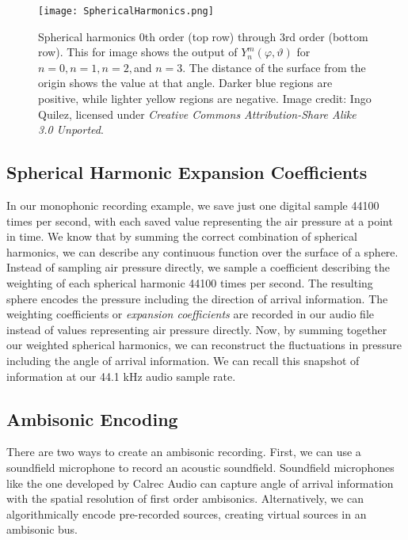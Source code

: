 \begin{figure}[h]
  \texttt{[image: SphericalHarmonics.png]}
  \caption{Spherical harmonics $0$th order (top row) through $3$rd
    order (bottom row). This for image shows the output of
    $Y_{n}^{m}(\varphi,\vartheta)$ for $n=0,n=1,n=2,$and $n=3$. The
    distance of the surface from the origin shows the value at that
    angle. Darker blue regions are positive, while lighter yellow
    regions are negative. Image credit: Ingo Quilez, licensed under
    \textit{Creative Commons Attribution-Share Alike 3.0 Unported}.}
  \label{fig:spherical-harmonics}
\end{figure}

\subsection{Spherical Harmonic Expansion Coefficients}
\label{sec:spher-harm-expans}
In our monophonic recording example, we save just one digital sample
44100 times per second, with each saved value representing the air
pressure at a point in time. We know that by summing the correct
combination of spherical harmonics, we can describe any continuous
function over the surface of a sphere. Instead of sampling air
pressure directly, we sample a coefficient describing the weighting of
each spherical harmonic 44100 times per second. The resulting sphere
encodes the pressure including the direction of arrival
information. The weighting coefficients or \textit{expansion
  coefficients} are recorded in our audio file instead of values
representing air pressure directly. Now, by summing together our
weighted spherical harmonics, we can reconstruct the fluctuations in
pressure including the angle of arrival information. We can recall
this snapshot of information at our 44.1 kHz audio sample rate.

\subsection{Ambisonic Encoding}
\label{sec:usage}
There are two ways to create an ambisonic recording. First, we can use
a soundfield microphone to record an acoustic soundfield. Soundfield
microphones like the one developed by Calrec Audio can capture angle
of arrival information with the spatial resolution of first order
ambisonics.\cite[-1in]{Ferrar1979} Alternatively, we can algorithmically
encode pre-recorded sources, creating virtual sources in an
ambisonic bus.\cite[-0.4in]{Malham1995}

